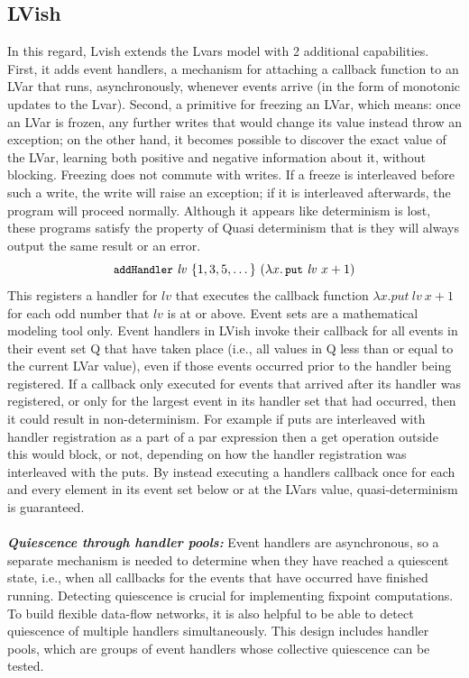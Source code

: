 \documentclass[twocolumn]{article}
\newcommand\termfont[1]{\mbox{\small{\texttt{#1}}}}
\newcommand{\lam}[2]{\ensuremath{\lambda#1.\,#2}}
\newcommand{\PUT}{\termfont{put}}
\newcommand{\putexp}[2]{\ensuremath{\PUT~#1~#2}}
\newcommand{\ADDHANDLER}{{\termfont{addHandler}}}
\begin{document}
\subsection{LVish}
In this regard, Lvish\cite{lkuper2} extends the Lvars model with 2 additional capabilities. First, it adds event handlers, a mechanism for attaching a callback function to an LVar that runs, asynchronously, whenever events arrive (in the form of monotonic updates to the Lvar). Second, a primitive for freezing an LVar, which means: once an LVar is frozen, any further writes that would change its value instead throw an exception; on the other hand, it becomes possible to discover the exact value of the LVar, learning both positive and negative information about it, without blocking.
Freezing does not commute with writes. If a freeze is interleaved before such a write, the write will raise an exception; if it is interleaved afterwards, the program will proceed normally. Although it appears like determinism is lost, these programs satisfy the property of Quasi determinism that is they will always output the same result or an error.
\vspace{-8mm}
\singlespacing
\begin{equation}
\ADDHANDLER~\mathit{lv}~\{ 1, 3, 5, \dots \}~(\lam{x}{\putexp{\mathit{lv}}{x+1}})
\label{e:lvish-example-1}
\end{equation}
This registers a handler for $lv$ that executes the callback function $\lambda{x}.put\ lv\ x + 1$ for each odd number that $lv$ is at or above. Event sets are a mathematical modeling tool only. Event handlers in LVish invoke their callback for all events in their event set Q that have taken place (i.e., all values in Q less than or equal to the current LVar value), even if those events occurred prior to the handler being registered. If a callback only executed for events that arrived after its handler was registered, or only for the largest event in its handler set that had occurred, then it could result in non-determinism. For example if puts are interleaved with handler registration as a part of a par expression then a get operation outside this would block, or not, depending on how the handler registration was interleaved with the puts. By instead executing a handlers callback once for each and every element in its event set below or at the LVars value, quasi-determinism is guaranteed. \\ \\
\textbf{\textit{Quiescence through handler pools:}} Event handlers are asynchronous, so a separate mechanism is needed to determine when they have reached a quiescent state, i.e., when all callbacks for the events that have occurred have finished running. Detecting quiescence is crucial for implementing fixpoint computations. To build flexible data-flow networks, it is also helpful to be able to detect quiescence of multiple handlers simultaneously. This design includes handler pools, which are groups of event handlers whose collective quiescence can be tested.
\end{document}
